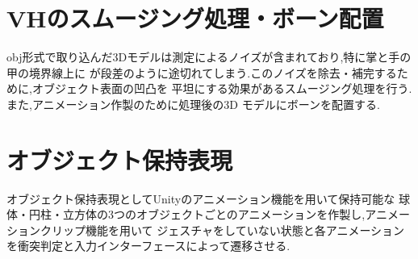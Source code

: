 \documentclass{ltjsreport}
\begin{document}
	\section{VHのスムージング処理・ボーン配置}
		obj形式で取り込んだ3Dモデルは測定によるノイズが含まれており,特に掌と手の甲の境界線上に
		が段差のように途切れてしまう.このノイズを除去・補完するために,オブジェクト表面の凹凸を
		平坦にする効果があるスムージング処理を行う.また,アニメーション作製のために処理後の3D
		モデルにボーンを配置する.

	
	\section{オブジェクト保持表現}
		オブジェクト保持表現としてUnityのアニメーション機能を用いて保持可能な
		球体・円柱・立方体の3つのオブジェクトごとのアニメーションを作製し,アニメーションクリップ機能を用いて
		ジェスチャをしていない状態と各アニメーションを衝突判定と入力インターフェースによって遷移させる.
\end{document}
